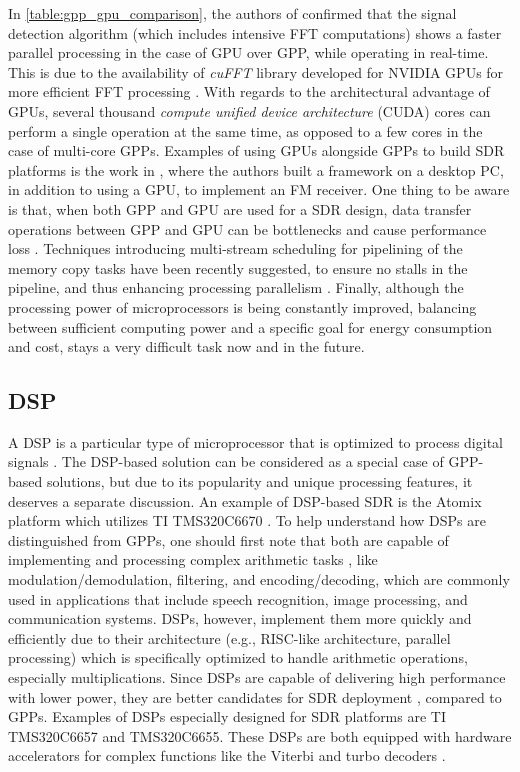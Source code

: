 In \autoref{table:gpp_gpu_comparison}, the authors of \cite{fi2017a} confirmed that the signal detection algorithm (which includes intensive FFT computations) shows a faster parallel processing in the case of GPU over GPP, while operating in real-time. This is due to the availability of \emph{cuFFT} library developed for NVIDIA GPUs for more efficient FFT processing \cite{cuda_toolkit}. With regards to the architectural advantage of GPUs, several thousand \emph{compute unified device architecture} (CUDA) cores can perform a single operation at the same time, as opposed to a few cores in the case of multi-core GPPs. Examples of using GPUs alongside GPPs to build SDR platforms is the work in \cite{szegvari2009a}, where the authors built a framework on a desktop PC, in addition to using a GPU, to implement an FM receiver. One thing to be aware is that, when both GPP and GPU are used for a SDR design, data transfer operations between GPP and GPU can be bottlenecks and cause performance loss \cite{li2014a}. Techniques introducing multi-stream scheduling for pipelining of the memory copy tasks have been recently suggested, to ensure no stalls in the pipeline, and thus enhancing processing parallelism \cite{accelerating_massive_mimo_uplink} \cite{millage2010a}. Finally, although the processing power of microprocessors is being constantly improved, balancing between sufficient computing power and a specific goal for energy consumption and cost, stays a very difficult task now and in the future.

\subsection{DSP}

A DSP is a particular type of microprocessor that is optimized to process digital signals \cite{rabiner1978a}. The DSP-based solution can be considered as a special case of GPP-based solutions, but due to its popularity and unique processing features, it deserves a separate discussion. An example of DSP-based SDR is the Atomix platform \cite{atomix} which utilizes TI TMS320C6670 \cite{unknown-h}. To help understand how DSPs are distinguished from GPPs, one should first note that both are capable of implementing and processing complex arithmetic tasks \cite{smith1997a}, like modulation/demodulation, filtering, and encoding/decoding, which are commonly used in applications that include speech recognition, image processing, and communication systems. DSPs, however, implement them more quickly and efficiently due to their architecture (e.g., RISC-like architecture, parallel processing) which is specifically optimized to handle arithmetic operations, especially multiplications. Since DSPs are capable of delivering high performance with lower power, they are better candidates for SDR deployment \cite{dyer1993a}, compared to GPPs. Examples of DSPs especially designed for SDR platforms are TI TMS320C6657 and TMS320C6655. These DSPs are both equipped with hardware accelerators for complex functions like the Viterbi and turbo decoders \cite{unknown-i}.


